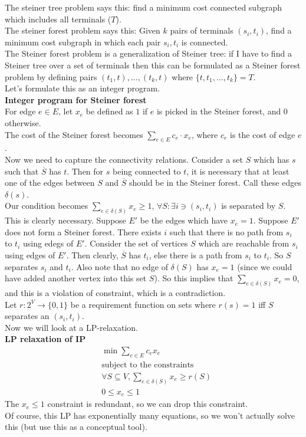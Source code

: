 \documentclass[a4paper]{article}
\newcommand{\nl}{\vspace{0.2cm}\\}
\begin{document}
The steiner tree problem says this: find a minimum cost connected subgraph which includes all terminals ($T$).\nl
The steiner forest problem says this: Given $k$ pairs of terminals $(s_i, t_i)$, find a minimum cost subgraph in which each pair $s_i, t_i$ is connected.\nl
The Steiner forest problem is a generalization of Steiner tree: if I have to find a Steiner tree over a set of terminals then this can be formulated as a Steiner forest problem by defining pairs
$(t_1, t), \ldots, (t_k, t)$ where $\{t, t_1, \ldots, t_k\} = T$.\nl
Let's formulate this as an integer program.\nl
\textbf{Integer program for Steiner forest}\nl
For edge $e \in E$, let $x_e$ be defined as $1$ if $e$ is picked in the Steiner forest, and $0$ otherwise.\nl
The cost of the Steiner forest becomes $\sum_{e \in E} c_e \cdot x_e$, where $c_e$ is the cost of edge $e$.\nl
Now we need to capture the connectivity relations. Consider a set $S$ which has $s$ such that $\overline{S}$ has $t$. Then for $s$ being connected to $t$, it is necessary that at least one
of the edges between $S$ and $\overline{S}$ should be in the Steiner forest. Call these edges $\delta(s)$.\nl
Our condition becomes $\sum_{e \in \delta(S)} x_e \ge 1$, $\forall S : \exists i \ni (s_i, t_i)$ is separated by $S$.\nl
This is clearly necessary. Suppose $E'$ be the edges which have $x_e = 1$. Suppose $E'$ does not form a Steiner forest. There exists $i$ such that there is no path from $s_i$ to $t_i$ using edegs
of $E'$. Consider the set of vertices $S$ which are reachable from $s_i$ using edges of $E'$. Then clearly, $\overline{S}$ has $t_i$, else there is a path from $s_i$ to $t_i$. So $S$ separates
$s_i$ and $t_i$. Also note that no edge of $\delta(S)$ has $x_e = 1$ (since we could have added another vertex into this set $S$). So this implies that $\sum_{e \in \delta(S)} x_e = 0$, and
this is a violation of constraint, which is a contradiction.\nl
Let $r : 2^V \to \{0, 1\}$ be a requirement function on sets where $r(s) = 1$ iff $S$ separates an $(s_i, t_i)$.\nl
Now we will look at a LP-relaxation.\nl
\textbf{LP relaxation of IP}\nl
\begin{align*}
    &\min \sum_{e \in E} c_e x_e\\
    &\text{subject to the constraints}\\
    &\forall S \subseteq V, \sum_{e \in \delta(S)} x_e \ge r(S)\\
    &0 \le x_e \le 1
\end{align*}
The $x_e \le 1$ constraint is redundant, so we can drop this constraint.\nl
Of course, this LP has exponentially many equations, so we won't actually solve this (but use this as a conceptual tool).\nl
\end{document}
